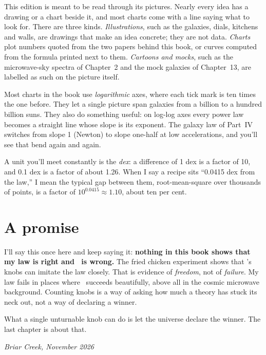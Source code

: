 This edition is meant to be read through its pictures. Nearly every idea has a drawing or a chart beside it, and most charts come with a line saying what to look for. There are three kinds. \emph{Illustrations}, such as the galaxies, dials, kitchens and walls, are drawings that make an idea concrete; they are not data. \emph{Charts} plot numbers quoted from the two papers behind this book, or curves computed from the formula printed next to them. \emph{Cartoons and mocks}, such as the microwave-sky spectra of Chapter~2 and the mock galaxies of Chapter~13, are labelled as such on the picture itself.

Most charts in the book use \emph{logarithmic} axes, where each tick mark is ten times the one before. They let a single picture span galaxies from a billion to a hundred billion suns. They also do something useful: on log-log axes every power law becomes a straight line whose slope is its exponent. The galaxy law of Part~IV switches from slope 1 (Newton) to slope one-half at low accelerations, and you'll see that bend again and again.




A unit you'll meet constantly is the \emph{dex}: a difference of 1 dex is a factor of 10, and 0.1 dex is a factor of about 1.26. When I say a recipe sits ``0.0415 dex from the law,'' I mean the typical gap between them, root-mean-square over thousands of points, is a factor of $10^{0.0415}\approx1.10$, about ten per cent.

\section*{A promise}

I'll say this once here and keep saying it: \textbf{nothing in this book shows that my law is right and \LCDM\ is wrong.} The fried chicken experiment shows that \LCDM's knobs can imitate the law closely. That is evidence of \emph{freedom}, not of \emph{failure}. My law fails in places where \LCDM\ succeeds beautifully, above all in the cosmic microwave background. Counting knobs is a way of asking how much a theory has stuck its neck out, not a way of declaring a winner.

What a single unturnable knob can do is let the universe declare the winner. The last chapter is about that.

\bigskip
\noindent\emph{Briar Creek, November 2026}
